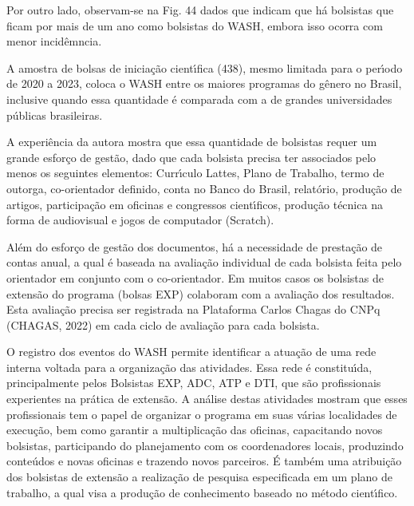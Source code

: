 \documentclass[
12pt,		%
openright,	%
twoside,  %
a4paper,			%
chapter=TITLE,		%
english,			%
french,				%
spanish,			%
brazil				%
]{USPSC-classe/USPSC}
\begin{document}
Por outro lado, observam-se na Fig. 44 dados que indicam que h\'a bolsistas que ficam por mais de um ano como bolsistas do WASH, embora isso ocorra com menor incid\^emncia.








A amostra de bolsas de inicia\c{c}\~ao cient\'{\i}fica (438), mesmo limitada para o per\'{\i}odo de 2020 a 2023, coloca o WASH entre os maiores programas do g\^enero no Brasil, inclusive quando essa quantidade \'e comparada com a de grandes universidades p\'ublicas brasileiras.








A experi\^encia da autora mostra que essa quantidade de bolsistas requer um grande esfor\c{c}o de gest\~ao, dado que cada bolsista precisa ter associados pelo menos os seguintes elementos: Curr\'{\i}culo Lattes, Plano de Trabalho, termo de outorga, co-orientador definido, conta no Banco do Brasil, relat\'orio, produ\c{c}\~ao de artigos, participa\c{c}\~ao em oficinas e congressos cient\'{\i}ficos, produ\c{c}\~ao t\'ecnica na forma de audiovisual e jogos de computador (Scratch).








Al\'em do esfor\c{c}o de gest\~ao dos documentos, h\'a a necessidade de presta\c{c}\~ao de contas anual, a qual \'e baseada na avalia\c{c}\~ao individual de cada bolsista feita pelo orientador em conjunto com o co-orientador. Em muitos casos os bolsistas de extens\~ao do programa (bolsas EXP) colaboram com a avalia\c{c}\~ao dos resultados. Esta avalia\c{c}\~ao precisa ser registrada na Plataforma Carlos Chagas do CNPq  (CHAGAS, 2022) em cada ciclo de avalia\c{c}\~ao para cada bolsista.








O registro dos eventos do WASH permite identificar a atua\c{c}\~ao de uma rede interna voltada para a organiza\c{c}\~ao das atividades. Essa rede \'e constitu\'{\i}da, principalmente pelos  Bolsistas EXP, ADC, ATP e DTI, que s\~ao profissionais experientes na pr\'atica de extens\~ao. A an\'alise destas atividades mostram que esses profissionais tem o papel de organizar o programa em suas v\'arias localidades de execu\c{c}\~ao, bem como garantir a multiplica\c{c}\~ao das oficinas, capacitando novos bolsistas, participando do planejamento com os coordenadores locais, produzindo conte\'udos e novas oficinas e trazendo novos parceiros. \'E tamb\'em uma atribui\c{c}\~ao dos bolsistas de extens\~ao a realiza\c{c}\~ao de pesquisa especificada em um plano de trabalho, a qual visa a produ\c{c}\~ao de conhecimento baseado no m\'etodo cient\'{\i}fico.
\end{document}
